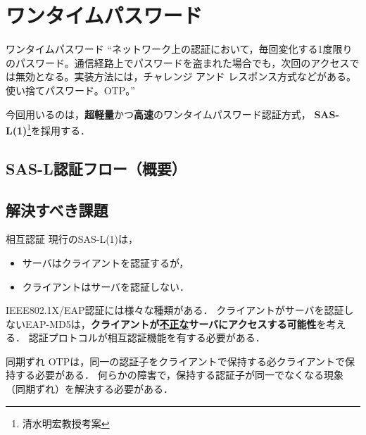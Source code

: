 \section{ワンタイムパスワード}
\toc
\begin{frame}[c]{\fft}
    \begin{block}{ワンタイムパスワード}
        ``ネットワーク上の認証において，毎回変化する1度限りのパスワード。通信経路上でパスワードを盗まれた場合でも，次回のアクセスでは無効となる。実装方法には，チャレンジ アンド レスポンス方式などがある。使い捨てパスワード。OTP。''
    \end{block}
    \vfill
    今回用いるのは，\textbf{超軽量}かつ\textbf{高速}のワンタイムパスワード認証方式，\textbf{\color{red} SAS-L(1)}\footnote{清水明宏教授考案}を採用する．
\end{frame}
\subsection{SAS-L認証フロー（概要）}
\begin{frame}{\ft}
    
\end{frame}
\subsection{解決すべき課題}
\begin{frame}[t]{\ft}
    \begin{alertblock}{相互認証\hfill\textbf{}}
        現行のSAS-L(1)は，
        \begin{itemize}
            \item サーバはクライアントを認証するが，
            \item クライアントはサーバを認証しない．
        \end{itemize}
        IEEE802.1X/EAP認証には様々な種類がある．
        クライアントがサーバを認証しないEAP-MD5は，\textbf{クライアントが\underline{不正な}サーバにアクセスする可能性}を考える．
        認証プロトコルが相互認証機能を有する必要がある．
    \end{alertblock}
    \begin{alertblock}{同期ずれ\hfill\textbf{}}
        OTPは，同一の認証子をクライアントで保持する必クライアントで保持する必要がある．
        何らかの障害で，保持する認証子が同一でなくなる現象（同期ずれ）を解決する必要がある．
    \end{alertblock}
\end{frame}